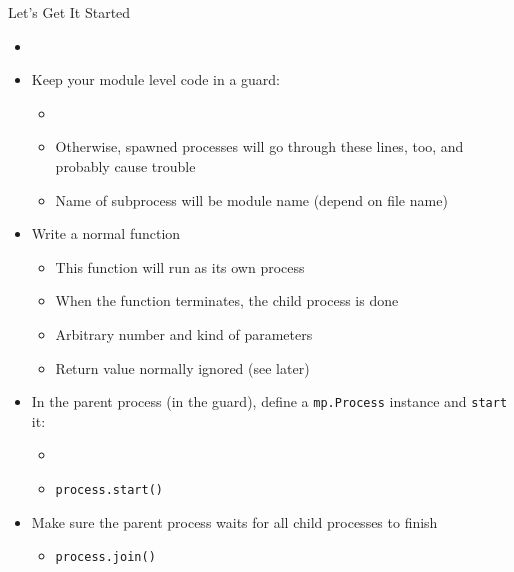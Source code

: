 \begin{frame}[fragile]{Let's Get It Started}
%
\begin{itemize}
\small
\item {}
\item Keep your module level code in a  guard:
	\begin{itemize}
	\item {}
	\item Otherwise, spawned processes will go through these lines, too, and probably cause trouble
	\item Name of subprocess will be module name (\ie depend on file name)
	\end{itemize}
\item Write a normal function 
	\begin{itemize}
	\item This function will run as its own process
	\item When the function terminates, the child process is done
	\item Arbitrary number and kind of parameters
	\item Return value normally ignored (see later)
	\end{itemize}
\item In the parent process (\zB in the  guard), define a \texttt{mp.Process} instance and \texttt{start} it:
	\begin{itemize}
	\item {}
	\item \texttt{process.start()}
	\end{itemize}
\item Make sure the parent process waits for all child processes to finish
	\begin{itemize}
	\item \texttt{process.join()}
	\end{itemize}
\end{itemize}
%
\end{frame}


